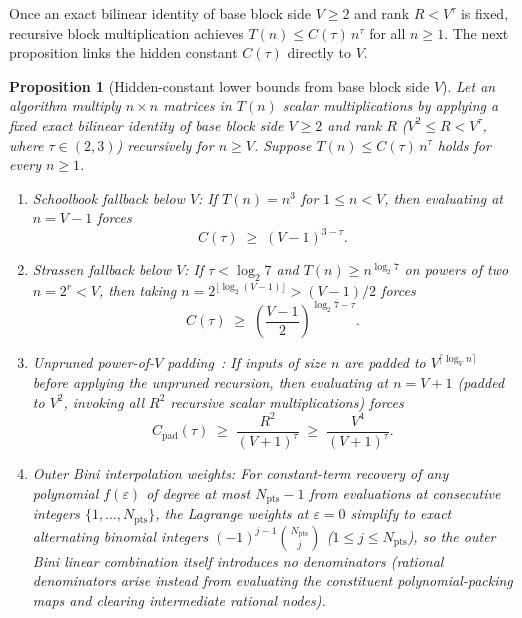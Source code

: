 \documentclass[11pt,a4paper]{article}
\theoremstyle{plain}
\newtheorem{proposition}[theorem]{Proposition}
\theoremstyle{definition}
\theoremstyle{remark}
\begin{document}
Once an exact bilinear identity of base block side $V \ge 2$ and rank $R < V^\tau$ is fixed, recursive block multiplication achieves $T(n) \le C(\tau)\,n^\tau$ for all $n \ge 1$. The next proposition links the hidden constant $C(\tau)$ directly to $V$.

\begin{proposition}[Hidden-constant lower bounds from base block side $V$]
\label{prop:hidden_constant}
Let an algorithm multiply $n \times n$ matrices in $T(n)$ scalar multiplications by applying a fixed exact bilinear identity of base block side $V \ge 2$ and rank $R$ ($V^2 \le R < V^\tau$, where $\tau \in (2, 3)$) recursively for $n \ge V$. Suppose $T(n) \le C(\tau)\,n^\tau$ holds for every $n \ge 1$.
\begin{enumerate}[label=(\roman*)]
\item \emph{Schoolbook fallback below $V$:} If $T(n) = n^3$ for $1 \le n < V$, then evaluating at $n = V - 1$ forces
\begin{equation}
    C(\tau) \;\ge\; (V - 1)^{3 - \tau} .
    \label{eq:C_schoolbook}
\end{equation}
\item \emph{Strassen fallback below $V$:} If $\tau < \log_2 7$ and $T(n) \ge n^{\log_2 7}$ on powers of two $n = 2^r < V$, then taking $n = 2^{\lfloor \log_2(V - 1)\rfloor} > (V - 1)/2$ forces
\begin{equation}
    C(\tau) \;\ge\; \left(\frac{V - 1}{2}\right)^{\log_2 7 - \tau} .
    \label{eq:C_strassen}
\end{equation}
\item \emph{Unpruned power-of-$V$ padding~\cite[Section~4.3]{Pass2026}:} If inputs of size $n$ are padded to $V^{\lceil \log_V n\rceil}$ before applying the unpruned recursion, then evaluating at $n = V + 1$ (padded to $V^2$, invoking all $R^2$ recursive scalar multiplications) forces
\begin{equation}
    C_{\mathrm{pad}}(\tau) \;\ge\; \frac{R^2}{(V + 1)^\tau} \;\ge\; \frac{V^4}{(V + 1)^\tau} .
    \label{eq:C_padding}
\end{equation}
\item \emph{Outer Bini interpolation weights:} For constant-term recovery of any polynomial $f(\varepsilon)$ of degree at most $N_{\mathrm{pts}} - 1$ from evaluations at consecutive integers $\{1, \dots, N_{\mathrm{pts}}\}$, the Lagrange weights at $\varepsilon = 0$ simplify to exact alternating binomial integers $(-1)^{j-1}\binom{N_{\mathrm{pts}}}{j}$ ($1 \le j \le N_{\mathrm{pts}}$), so the outer Bini linear combination itself introduces no denominators (rational denominators arise instead from evaluating the constituent polynomial-packing maps and clearing intermediate rational nodes).
\end{enumerate}
\end{proposition}
\end{document}

